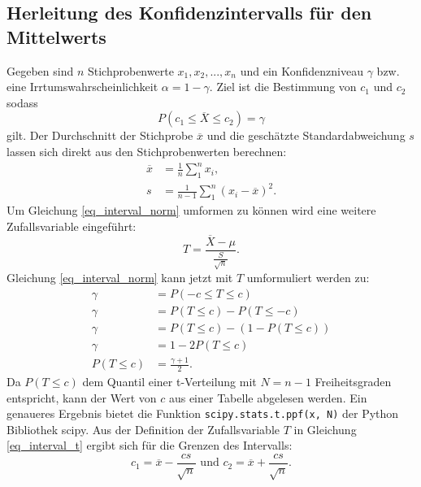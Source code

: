 \documentclass[10pt,twocolumn]{scrartcl}
\begin{document}
	\subsection{Herleitung des Konfidenzintervalls für den Mittelwerts }
		\label{chap_interval_mean_math}
		Gegeben sind $n$ Stichprobenwerte $x_1, x_2, ..., x_n$ und ein Konfidenzniveau $\gamma$ bzw. eine Irrtumswahrscheinlichkeit $\alpha = 1 - \gamma$.
		Ziel ist die Bestimmung von $c_1$ und $c_2$ sodass
		\begin{equation} \label{eq_interval_norm}
		P(c_1 \le \overline{X} \le c_2) = \gamma
		\end{equation}
		gilt.
		Der Durchschnitt der Stichprobe $\overline{x}$ und die geschätzte Standardabweichung $s$ lassen sich direkt aus den Stichprobenwerten berechnen:
		\begin{align}
		\overline{x} &=  \frac{1}{n} \sum_1^n{x_i} , \\
		s &= \frac{1}{n-1} \sum_1^n{(x_i - \overline{x})^2} .
		\end{align}
		Um Gleichung \ref{eq_interval_norm} umformen zu können wird eine weitere Zufallsvariable eingeführt:
		\begin{equation} \label{eq_interval_t}
		T = \frac{\overline{X} - \mu}{\frac{S}{\sqrt{n}}} .
		\end{equation}
		Gleichung \ref{eq_interval_norm} kann jetzt mit $T$ umformuliert werden zu:
		\begin{align}
		\gamma &= P(-c \le T \le c) \\ \nonumber
		\gamma &= P(T \le c) - P(T \le -c) \\ \nonumber
		\gamma &= P(T \le c) - (1 - P(T \le c)) \\ \nonumber
		\gamma &= 1 - 2 P(T \le c) \\
		P(T \le c) &= \frac{\gamma + 1}{2} .
		\end{align}
		Da $P(T \le c)$ dem Quantil einer t-Verteilung mit $N = n-1$ Freiheitsgraden entspricht, kann der Wert von $c$ aus einer Tabelle abgelesen werden. Ein genaueres Ergebnis bietet die Funktion \texttt{scipy.stats.t.ppf(x, N)} der Python Bibliothek scipy\cite{scipy}.
		Aus der Definition der Zufallsvariable $T$ in Gleichung \ref{eq_interval_t} ergibt sich für die Grenzen des Intervalls:
		\begin{equation}
		c_1 = \overline{x} - \frac{cs}{\sqrt{n}} \mbox{ und } c_2 = \overline{x} + \frac{cs}{\sqrt{n}}.
		\end{equation}
\end{document}
